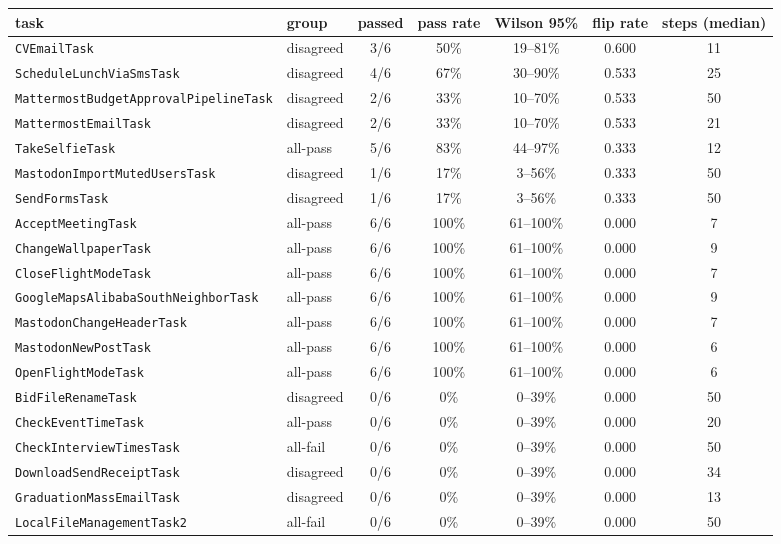 \begin{tabular}{llccccc}
\toprule
task & group & passed & pass rate & Wilson 95\% & flip rate & steps (median) \\
\midrule
\texttt{CVEmailTask} & disagreed & 3/6 & 50\% & 19--81\% & 0.600 & 11 \\
\texttt{ScheduleLunchViaSmsTask} & disagreed & 4/6 & 67\% & 30--90\% & 0.533 & 25 \\
\texttt{MattermostBudgetApprovalPipelineTask} & disagreed & 2/6 & 33\% & 10--70\% & 0.533 & 50 \\
\texttt{MattermostEmailTask} & disagreed & 2/6 & 33\% & 10--70\% & 0.533 & 21 \\
\texttt{TakeSelfieTask} & all-pass & 5/6 & 83\% & 44--97\% & 0.333 & 12 \\
\texttt{MastodonImportMutedUsersTask} & disagreed & 1/6 & 17\% & 3--56\% & 0.333 & 50 \\
\texttt{SendFormsTask} & disagreed & 1/6 & 17\% & 3--56\% & 0.333 & 50 \\
\texttt{AcceptMeetingTask} & all-pass & 6/6 & 100\% & 61--100\% & 0.000 & 7 \\
\texttt{ChangeWallpaperTask} & all-pass & 6/6 & 100\% & 61--100\% & 0.000 & 9 \\
\texttt{CloseFlightModeTask} & all-pass & 6/6 & 100\% & 61--100\% & 0.000 & 7 \\
\texttt{GoogleMapsAlibabaSouthNeighborTask} & all-pass & 6/6 & 100\% & 61--100\% & 0.000 & 9 \\
\texttt{MastodonChangeHeaderTask} & all-pass & 6/6 & 100\% & 61--100\% & 0.000 & 7 \\
\texttt{MastodonNewPostTask} & all-pass & 6/6 & 100\% & 61--100\% & 0.000 & 6 \\
\texttt{OpenFlightModeTask} & all-pass & 6/6 & 100\% & 61--100\% & 0.000 & 6 \\
\texttt{BidFileRenameTask} & disagreed & 0/6 & 0\% & 0--39\% & 0.000 & 50 \\
\texttt{CheckEventTimeTask} & all-pass & 0/6 & 0\% & 0--39\% & 0.000 & 20 \\
\texttt{CheckInterviewTimesTask} & all-fail & 0/6 & 0\% & 0--39\% & 0.000 & 50 \\
\texttt{DownloadSendReceiptTask} & disagreed & 0/6 & 0\% & 0--39\% & 0.000 & 34 \\
\texttt{GraduationMassEmailTask} & disagreed & 0/6 & 0\% & 0--39\% & 0.000 & 13 \\
\texttt{LocalFileManagementTask2} & all-fail & 0/6 & 0\% & 0--39\% & 0.000 & 50 \\

\end{tabular}
